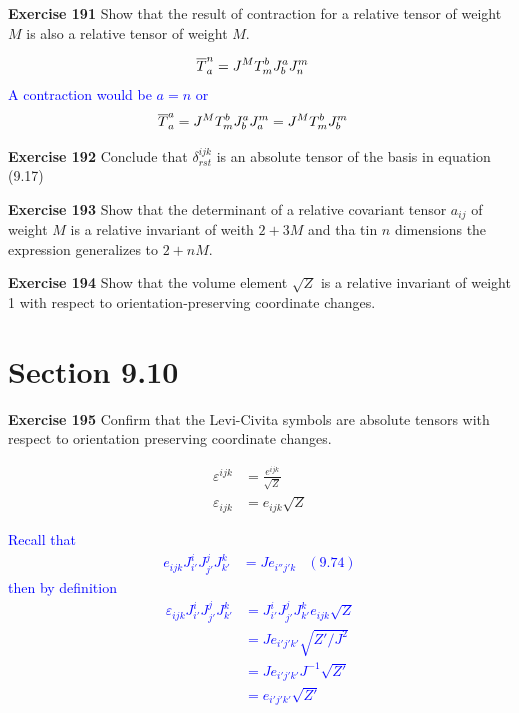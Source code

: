 \documentclass[12pt,a4paper]{report}
\newcommand{\BLUE}[1]{\textcolor{blue}{#1}}
\begin{document}
\begin{description}
\item \textbf{Exercise 191} Show that the result of contraction for a relative tensor of weight $M$ is also a relative tensor of weight $M$.

\BLUE{\begin{align*}
	\overline{T}	_a^n &= J^MT_m^bJ_b^aJ_n^m
\end{align*}A contraction would be $a=n$ or
\begin{align*}
	\overline{T}	_a^a &= J^MT_m^bJ_b^aJ_a^m = J^MT_m^bJ_b^m
\end{align*}
}

\item \textbf{Exercise 192} Conclude that $\delta_{rst}^{ijk}$ is an absolute tensor of the basis in equation (9.17)

\item \textbf{Exercise 193} Show that the determinant of a relative covariant tensor $a_{ij}$ of weight $M$ is a relative invariant of weith $2+3M$ and tha tin $n$ dimensions the expression generalizes to $2+nM$.

\item \textbf{Exercise 194} Show that the volume element $\sqrt{Z}$ is a relative invariant of weight 1 with respect to orientation-preserving coordinate changes.

\section{Section 9.10}
\item \textbf{Exercise 195} Confirm that the Levi-Civita symbols are absolute tensors with respect to orientation preserving coordinate changes.

\begin{align*}
	\varepsilon^{ijk} &= \frac{e^{ijk}}{\sqrt{Z}} \\
	\varepsilon_{ijk} &= e_{ijk}\sqrt{Z}
\end{align*}

\BLUE{Recall that \begin{align*}
	e_{ijk}J_{i'}^iJ_{j'}^jJ_{k'}^k &= Je_{i''j'k} & (9.74) 
\end{align*} then by definition
\begin{align*}
	\varepsilon_{ijk}J_{i'}^iJ_{j'}^jJ_{k'}^k &= J_{i'}^iJ_{j'}^jJ_{k'}^ke_{ijk}\sqrt{Z} \\
	&= Je_{i'j'k'} \sqrt{Z'/J^2} \\
	&= Je_{i'j'k'} J^{-1}\sqrt{Z'} \\
	&= e_{i'j'k'} \sqrt{Z'}
\end{align*}
}


\end{description}
\end{document}
